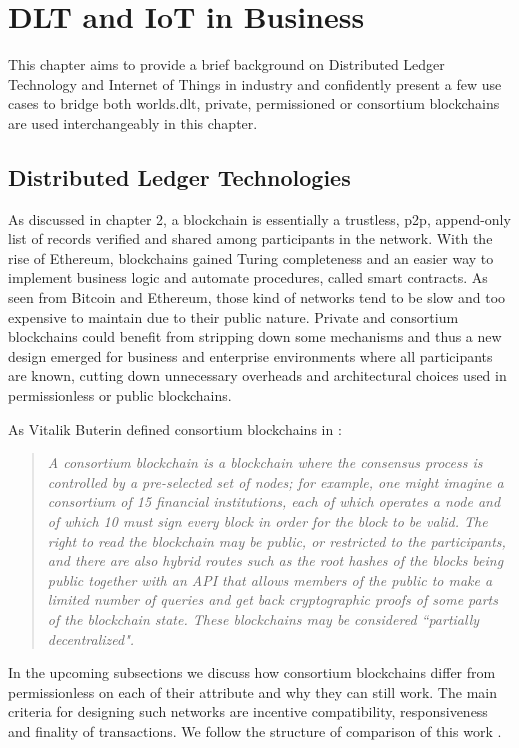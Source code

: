 \chapter{DLT and IoT in Business}
This chapter aims to provide a brief background on Distributed Ledger Technology and Internet of Things in industry and confidently present a few use cases to bridge both worlds.\acrfull{dlt}, private, permissioned or consortium blockchains are used interchangeably in this chapter. 

\section{Distributed Ledger Technologies} 
As discussed in chapter 2, a blockchain is essentially a trustless, \acrshort{p2p}, append-only list of records verified and shared among participants in the network. With the rise of Ethereum, blockchains gained Turing completeness and an easier way to implement business logic and automate procedures, called smart contracts. As seen from Bitcoin and Ethereum, those kind of networks tend to be slow and too expensive to maintain due to their public nature. Private and consortium blockchains could benefit from stripping down some mechanisms and thus a new design emerged for business and enterprise environments where all participants are known, cutting down unnecessary overheads and architectural choices used in permissionless or public blockchains. 

As Vitalik Buterin defined consortium blockchains in \cite{buterin2015public}:
\begin{quote}
    \textit{A consortium blockchain is a blockchain where the consensus process is controlled by a pre-selected set of nodes; for example, one might imagine a consortium of 15 financial institutions, each of which operates a node and of which 10 must sign every block in order for the block to be valid. The right to read the blockchain may be public, or restricted to the participants, and there are also hybrid routes such as the root hashes of the blocks being public together with an API that allows members of the public to make a limited number of queries and get back cryptographic proofs of some parts of the blockchain state. These blockchains may be considered ``partially decentralized".}
\end{quote}

In the upcoming subsections we discuss how consortium blockchains differ from permissionless on each of their attribute and why they can still work. The main criteria for designing such networks are incentive compatibility, responsiveness and finality of transactions. We follow the structure of comparison of this work \cite{dib2018consortium}.   

